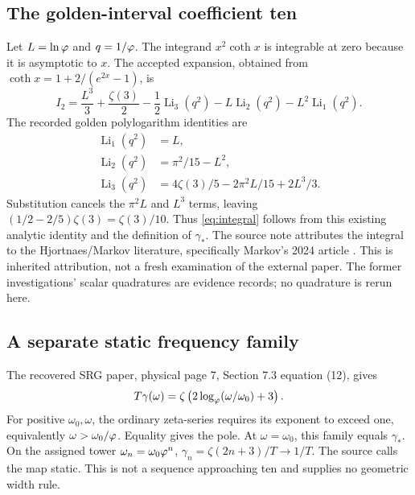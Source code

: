 \documentclass[11pt,a4paper]{article}
\begin{document}
\subsection{The golden-interval coefficient ten}
Let $L=\ln\varphi$ and $q=1/\varphi$. The integrand $x^2\coth x$ is integrable at zero because it is asymptotic to $x$. The accepted expansion, obtained from $\coth x=1+2/(e^{2x}-1)$, is
\begin{equation}\label{eq:polyexpand}
I_2=\frac{L^3}{3}+\frac{\zeta(3)}2
-\frac12\operatorname{Li}_3(q^2)-L\operatorname{Li}_2(q^2)-L^2\operatorname{Li}_1(q^2).
\end{equation}
The recorded golden polylogarithm identities are
\begin{equation}\label{eq:goldenpoly}
\begin{aligned}
\operatorname{Li}_1(q^2)&=L,\\
\operatorname{Li}_2(q^2)&=\pi^2/15-L^2,\\
\operatorname{Li}_3(q^2)&=4\zeta(3)/5-2\pi^2L/15+2L^3/3.
\end{aligned}
\end{equation}
Substitution cancels the $\pi^2L$ and $L^3$ terms, leaving $(1/2-2/5)\zeta(3)=\zeta(3)/10$. Thus \eqref{eq:integral} follows from this existing analytic identity and the definition of $\gamma_*$. The source note attributes the integral to the Hjortnaes/Markov literature, specifically Markov's 2024 article \cite{Markov}. This is inherited attribution, not a fresh examination of the external paper. The former investigations' scalar quadratures are evidence records; no quadrature is rerun here.

\clearpage\subsection{A separate static frequency family}
The recovered SRG paper, physical page 7, Section 7.3 equation (12), gives
\begin{equation}\label{eq:frequency}
T\gamma(\omega)=\zeta\left(2\log_\varphi(\omega/\omega_0)+3\right).
\end{equation}
For positive $\omega_0,\omega$, the ordinary zeta-series requires its exponent to exceed one, equivalently $\omega>\omega_0/\varphi$. Equality gives the pole. At $\omega=\omega_0$, this family equals $\gamma_*$. On the assigned tower $\omega_n=\omega_0\varphi^n$, $\gamma_n=\zeta(2n+3)/T\to1/T$. The source calls the map static. This is not a sequence approaching ten and supplies no geometric width rule.
\end{document}
